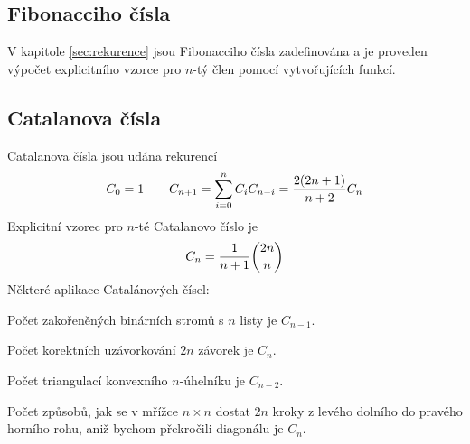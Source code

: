 \subsection{Fibonacciho čísla}

V kapitole \ref{sec:rekurence} jsou Fibonacciho čísla zadefinována a je
proveden výpočet explicitního vzorce pro $n$-tý člen pomocí vytvořujících
funkcí.

\subsection{Catalanova čísla}

Catalanova čísla jsou udána rekurencí
$$C_0 = 1\qquad C_{n+1} = \sum_{i=0}^n C_iC_{n-i} = {2(2n+1)\over n+2}C_n$$
Explicitní vzorec pro $n$-té Catalanovo číslo je 
$$C_n = {1\over n+1}{2n\choose n}$$
Některé aplikace Catalánových čísel:
\begin{itemize*}
\item Počet zakořeněných binárních stromů s $n$ listy je $C_{n-1}$.
\item Počet korektních uzávorkování $2n$ závorek je $C_n$.
\item Počet triangulací konvexního $n$-úhelníku je $C_{n-2}$.
\item Počet způsobů, jak se v mřížce $n\times n$ dostat $2n$ kroky z levého dolního do pravého horního rohu, aniž bychom překročili diagonálu je $C_n$.
\end{itemize*}


